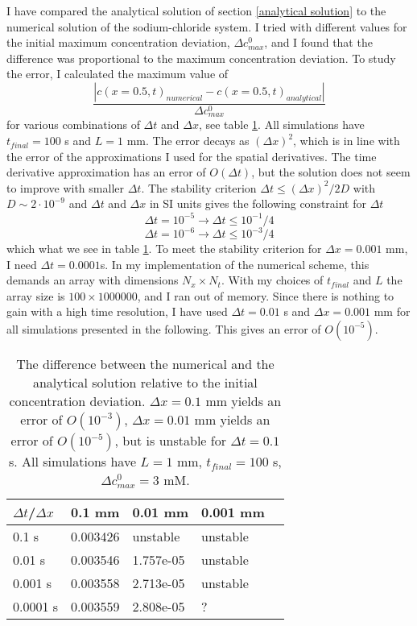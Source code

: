\documentclass{article}
\begin{document}
I have compared the analytical solution of section \ref{analytical solution} to the numerical solution of the sodium-chloride system. I tried with different values for the initial maximum concentration deviation, $\Delta c^0_{max}$, and I found that the difference was proportional to the maximum concentration deviation. To study the error, I calculated the maximum value of
\begin{equation}
\frac{|c(x=0.5,t)_{numerical}-c(x=0.5,t)_{analytical}|}{\Delta c^0_{max}}
\end{equation}
for various combinations of $\Delta t$ and $\Delta x$, see table \ref{tab:error}. All simulations have $t_{final} = 100$ s and $L=1$ mm. The error decays as $(\Delta x)^2$, which is in line with the error of the  approximations I used for the spatial derivatives. The time derivative approximation has an error of $O(\Delta t)$, but the solution does not seem to improve with smaller $\Delta t$. The stability criterion $\Delta t \leq (\Delta x)^2/2D$ with $D \sim 2\cdot 10^{-9}$ and $\Delta t $ and $\Delta x$ in SI units gives the following constraint for $\Delta t$
$$\Delta t= 10^{-5} \rightarrow \Delta t \leq 10^{-1}/4$$
$$\Delta t= 10^{-6} \rightarrow \Delta t \leq 10^{-3}/4$$ 
which what we see in table \ref{tab:error}. To meet the stability criterion for $\Delta x = 0.001$ mm, I need $\Delta t = 0.0001$s. In my implementation of the numerical scheme, this demands an array with dimensions $N_x \times N_t$. With my choices of $t_{final}$ and $L$ the array size is  $100\times 1000 000$, and I ran out of memory.
Since there is nothing to gain with a high time resolution, I have used $\Delta t = 0.01$ s and $\Delta x = 0.001$ mm for all simulations presented in the following. This gives an error of $O(10^{-5})$. 
\begin{table}[h!]
  \centering
  \caption{The difference between the numerical and the analytical solution relative to the initial concentration deviation. $\Delta x =0.1$ mm yields an error of $O(10^{-3})$, $\Delta x =0.01$ mm yields an error of $O(10^{-5})$, but is unstable for $\Delta t = 0.1$ s. All simulations have $L=1$ mm, $t_ {final} =100$ s, $\Delta c^0_{max} =3$ mM.}
  \label{tab:error}
  \begin{tabular}{l||l|l|l|l}
$\Delta t$/$\Delta x$ & 0.1 mm & 0.01 mm & 0.001 mm  \\
\hline
0.1 s & 0.003426 &  unstable & unstable \\
0.01 s & 0.003546 & 1.757e-05  & unstable \\
0.001 s & 0.003558 & 2.713e-05 & unstable \\
0.0001 s & 0.003559& 2.808e-05 & ? \\

 \end{tabular}
\end{table}
\end{document}
